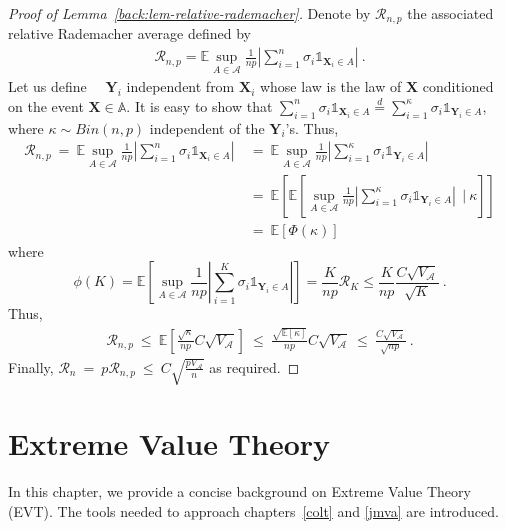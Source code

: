 \begin{proof}[Proof of Lemma~\ref{back:lem-relative-rademacher}]
Denote by $\mathcal{R}_{n,p}$ the associated relative Rademacher average defined by 
\begin{align*}
\mathcal{R}_{n,p} = \mathbb{E} \sup_{A \in \mathcal{A}} \frac{1}{np} \left | \sum_{i=1}^{n} \sigma_i \mathds{1}_{\mathbf{X}_i \in A}\right|~. 
\end{align*}
Let us define \iid~\rv~$\mathbf{Y}_i$ independent from $\mathbf{X}_i$ whose law is the law of $\mathbf{X}$ conditioned on the event $\mathbf{X} \in \mathbb{A}$. It is easy to show that
$\sum_{i=1}^n \sigma_i \mathds{1}_{\mathbf{X}_i \in A} \overset{d}{=} \sum_{i=1}^{\kappa} \sigma_i \mathds{1}_{\mathbf{Y}_i \in A}$, where $\kappa \sim Bin(n,p)$ independent of the $\mathbf{Y}_i$'s. %
Thus, 
\begin{align*}
\mathcal{R}_{n,p} ~=~ \mathbb{E} \sup_{A \in \mathcal{A}} \frac{1}{np} \left | \sum_{i=1}^{n} \sigma_i \mathds{1}_{\mathbf{X}_i \in A}\right| &~=~ \mathbb{E} \sup_{A \in \mathcal{A}} \frac{1}{np} \left | \sum_{i=1}^{\kappa} \sigma_i \mathds{1}_{\mathbf{Y}_i \in A}\right| \\
&~=~ \mathbb{E} \left[\mathbb{E} \left[\sup_{A \in \mathcal{A}} \frac{1}{np} \left | \sum_{i=1}^{\kappa} \sigma_i \mathds{1}_{\mathbf{Y}_i \in A} \right|~~|~\kappa \right] \right]\\
&~=~\mathbb{E}\left [ \Phi(\kappa)\right]
\end{align*}
where $$\phi(K) = \mathbb{E} \left[\sup_{A \in \mathcal{A}} \frac{1}{np} \left | \sum_{i=1}^{K} \sigma_i \mathds{1}_{\mathbf{Y}_i \in A} \right|\right] = \frac{K}{np} \mathcal{R}_K \le \frac{K}{np} \frac{C \sqrt{V_{\mathcal{A}}}}{\sqrt K}~.$$
Thus,
\begin{align*}
\mathcal{R}_{n,p} ~\le~ \mathbb{E}\left [ \frac{\sqrt \kappa}{np} C\sqrt{V_{\mathcal{A}}}\right] ~\le~ \frac{\sqrt{\mathbb{E}[\kappa]}}{np} C\sqrt{V_{\mathcal{A}}} ~\le~ \frac{C\sqrt{V_{\mathcal{A}}}}{\sqrt{np}} ~.
\end{align*}
Finally, $\mathcal{R}_n  ~=~ p \mathcal{R}_{n,p}  ~\le~ C \sqrt{\frac{p V_{\mathcal{A}}}{n}}$ as required.
\end{proof}

\chapter{Extreme Value Theory}
\label{back:EVT}
\begin{chapabstract}
In this chapter, we provide a concise background on Extreme Value Theory (EVT). The tools needed to approach chapters~\ref{colt} and \ref{jmva} are introduced. %
\end{chapabstract}

